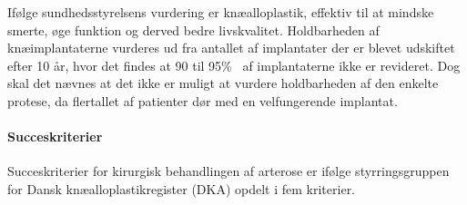 Ifølge sundhedsstyrelsens vurdering er knæalloplastik, effektiv til at mindske smerte, øge funktion og derved bedre livskvalitet. Holdbarheden af knæimplantaterne vurderes ud fra antallet af implantater der er blevet udskiftet efter 10 år, hvor det findes at 90 til 95\%~ af implantaterne ikke er revideret. Dog skal det nævnes at det ikke er muligt at vurdere holdbarheden af den enkelte protese, da flertallet af patienter dør med en velfungerende implantat. \citep{brostrom2012}

\paragraph{Succeskriterier}

Succeskriterier for kirurgisk behandlingen af arterose er ifølge styrringsgruppen for Dansk knæalloplastikregister (DKA) \citep{aarsrapport2016} opdelt i fem kriterier.

